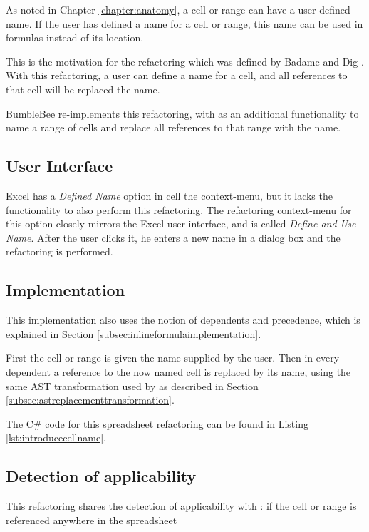 As noted in Chapter \ref{chapter:anatomy}, a cell or range can have a user defined name.
If the user has defined a name for a cell or range, this name can be used in formulas instead of its location.

This is the motivation for the  refactoring which was defined by Badame and Dig \cite{badame2012refactoring}.
With this refactoring, a user can define a name for a cell, and all references to that cell will be replaced the name.

BumbleBee re-implements this refactoring, with as an additional functionality to name a range of cells and replace all references to that range with the name.

\subsection{User Interface}

Excel has a \emph{Defined Name} option in cell the context-menu, but it lacks the functionality to also perform this refactoring.
The refactoring context-menu for this option closely mirrors the Excel user interface, and is called \emph{Define and Use Name}.
After the user clicks it, he enters a new name in a dialog box and the refactoring is performed.

\subsection{Implementation}

This implementation also uses the notion of dependents and precedence, which is explained in Section \ref{subsec:inlineformulaimplementation}.

First the cell or range is given the name supplied by the user.
Then in every dependent a reference to the now named cell is replaced by its name, using the same AST transformation used by  as described in Section \ref{subsec:astreplacementtransformation}.

The C\# code for this spreadsheet refactoring can be found in Listing \ref{lst:introducecellname}.

\subsection{Detection of applicability}

This refactoring shares the detection of applicability with : if the cell or range is referenced anywhere in the spreadsheet 

